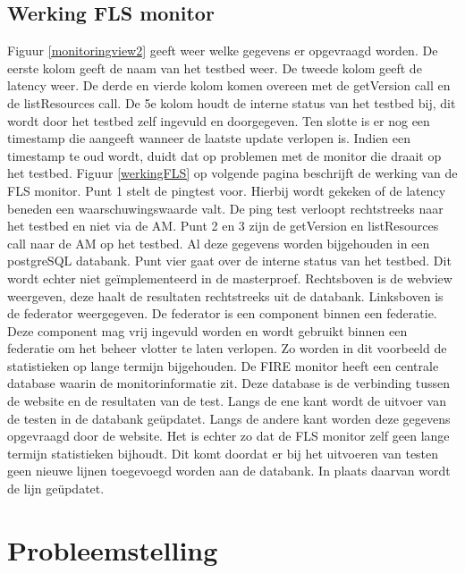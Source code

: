 \subsection{Werking FLS monitor}
\npar
Figuur \ref{monitoringview2} geeft weer welke gegevens er opgevraagd worden. 
De eerste kolom geeft de naam van het testbed weer. De tweede kolom geeft de latency weer. De derde en vierde kolom komen overeen met de getVersion call en de listResources call. De 5e kolom houdt de interne status van het testbed bij, dit wordt door het testbed zelf ingevuld en doorgegeven. Ten slotte is er nog een timestamp die aangeeft wanneer de laatste update verlopen is. Indien een timestamp te oud wordt, duidt dat op problemen met de monitor die draait op het testbed.
\npar
Figuur \ref{werkingFLS} op volgende pagina beschrijft de werking van de FLS monitor. Punt 1 stelt de pingtest voor. Hierbij wordt gekeken of de latency beneden een waarschuwingswaarde valt. De ping test verloopt rechtstreeks naar het testbed en niet via de AM. Punt 2 en 3 zijn de getVersion en listResources call naar de AM op het testbed. Al deze gegevens worden bijgehouden in een postgreSQL databank. Punt vier gaat over de interne status van het testbed. Dit wordt echter niet geïmplementeerd in de masterproef.
\npar
Rechtsboven is de webview weergeven, deze haalt de resultaten rechtstreeks uit de databank. Linksboven is de federator weergegeven. De federator is een component binnen een federatie. Deze component mag vrij ingevuld worden en wordt gebruikt binnen een federatie om het beheer vlotter te laten verlopen. Zo worden in dit voorbeeld de statistieken op lange termijn bijgehouden.
\npar
De FIRE monitor heeft een centrale database waarin de monitorinformatie zit. Deze database is de verbinding tussen de website en de resultaten van de test. Langs de ene kant wordt de uitvoer van de testen in de databank geüpdatet. Langs de andere kant worden deze gegevens opgevraagd door de website. Het is echter zo dat de FLS monitor zelf geen lange termijn statistieken bijhoudt. Dit komt doordat er bij het uitvoeren van testen geen nieuwe lijnen toegevoegd worden aan de databank. In plaats daarvan wordt de lijn geüpdatet.
\clearpage
\section{Probleemstelling}
